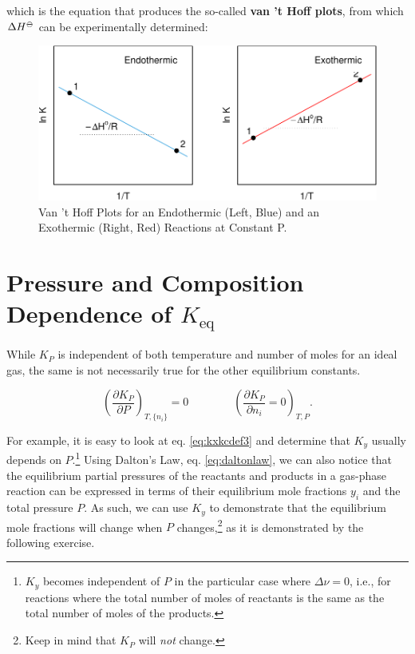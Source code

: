 \documentclass[
  9pt,
]{extbook}
\theoremstyle{definition}
\theoremstyle{definition}
\theoremstyle{definition}
\theoremstyle{remark}
\begin{document}
which is the equation that produces the so-called \textbf{van 't Hoff plots}, from which \(\Delta H^{-\kern-6pt{\ominus}\kern-6pt-}\) can be experimentally determined:

\begin{figure}

{\centering \includegraphics{pchem1_files/figure-latex/vthoffplt-1} 

}

\caption{Van 't Hoff Plots for an Endothermic (Left, Blue) and an Exothermic (Right, Red) Reactions at Constant P.}\label{fig:vthoffplt}
\end{figure}

\hypertarget{pressure-and-composition-dependence-of-k_texteq}{%
\section{\texorpdfstring{Pressure and Composition Dependence of \(K_{\text{eq}}\)}{Pressure and Composition Dependence of K\_\{\textbackslash text\{eq\}\}}}\label{pressure-and-composition-dependence-of-k_texteq}}

While \(K_P\) is independent of both temperature and number of moles for an ideal gas, the same is not necessarily true for the other equilibrium constants.

\begin{equation}
\left( \frac{\partial K_P}{\partial P} \right)_{T,\{n_i\}} = 0 \qquad \qquad \left( \frac{\partial K_P}{\partial n_i}=0 \right)_{T,P}.
\label{eq:kppni}
\end{equation}

For example, it is easy to look at eq. \eqref{eq:kxkcdef3} and determine that \(K_y\) usually depends on \(P\).\footnote{\(K_y\) becomes independent of \(P\) in the particular case where \(\Delta \nu=0\), i.e., for reactions where the total number of moles of reactants is the same as the total number of moles of the products.} Using Dalton's Law, eq. \eqref{eq:daltonlaw}, we can also notice that the equilibrium partial pressures of the reactants and products in a gas-phase reaction can be expressed in terms of their equilibrium mole fractions \(y_i\) and the total pressure \(P\). As such, we can use \(K_y\) to demonstrate that the equilibrium mole fractions will change when \(P\) changes,\footnote{Keep in mind that \(K_P\) will \emph{not} change.} as it is demonstrated by the following exercise.
\end{document}
